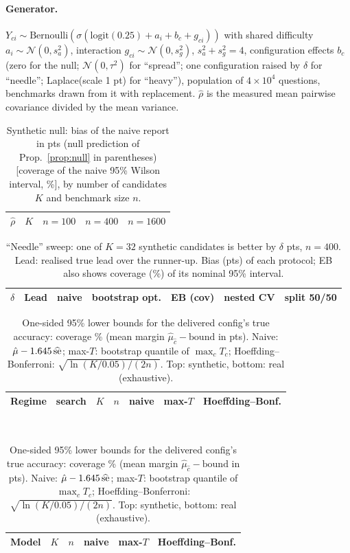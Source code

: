 \paragraph{Generator.} $Y_{ci}\sim\mathrm{Bernoulli}(\sigma(\mathrm{logit}(0.25)+a_i+b_c+g_{ci}))$ with shared difficulty $a_i\sim\mathcal N(0,s_a^2)$, interaction $g_{ci}\sim\mathcal N(0,s_g^2)$, $s_a^2+s_g^2=4$, configuration effects $b_c$ (zero for the null; $\mathcal N(0,\tau^2)$ for ``spread''; one configuration raised by $\delta$ for ``needle''; Laplace(scale 1 pt) for ``heavy''), population of $4\times10^4$ questions, benchmarks drawn from it with replacement.
$\hat\rho$ is the measured mean pairwise covariance divided by the mean variance.
\begin{table}[h]
\caption{Synthetic null: bias of the naive report in pts (null prediction of Prop.~\ref{prop:null} in parentheses) [coverage of the naive 95\% Wilson interval, \%], by number of candidates $K$ and benchmark size $n$.}\label{tab:synth_scale}
\centering\footnotesize
\begin{tabular}{rrlll}
\toprule $\hat\rho$ & $K$ & $n=100$ & $n=400$ & $n=1600$\\ \midrule
\end{tabular}
\end{table}
\begin{table}[h]
\caption{``Needle'' sweep: one of $K=32$ synthetic candidates is better by $\delta$ pts, $n=400$. Lead: realised true lead over the runner-up. Bias (pts) of each protocol; EB also shows coverage (\%) of its nominal 95\% interval.}\label{tab:needle}
\centering\footnotesize
\begin{tabular}{rrrrrrr}
\toprule $\delta$ & Lead & naive & bootstrap opt. & EB (cov) & nested CV & split 50/50\\ \midrule
\end{tabular}
\end{table}
\begin{table}[h]
\caption{One-sided 95\% lower bounds for the delivered config's true accuracy: coverage \% (mean margin $\hat\mu_{\hat c}-\mathrm{bound}$ in pts). Naive: $\hat\mu-1.645\,\widehat{\rm se}$; max-$T$: bootstrap quantile of $\max_c T_c$; Hoeffding--Bonferroni: $\sqrt{\ln(K/0.05)/(2n)}$. Top: synthetic, bottom: real (exhaustive).}\label{tab:lower}
\centering\footnotesize
\begin{tabular}{llrrrrr}
\toprule Regime & search & $K$ & $n$ & naive & max-$T$ & Hoeffding--Bonf.\\ \midrule
\end{tabular}\\[2pt]
\begin{tabular}{lrrrrr}
\toprule Model & $K$ & $n$ & naive & max-$T$ & Hoeffding--Bonf.\\ \midrule
\end{tabular}
\end{table}

